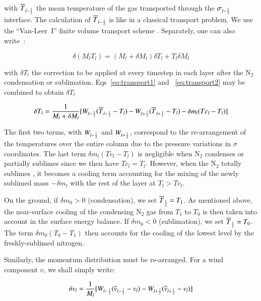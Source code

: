 with $\overline{T}_{l-\frac{1}{2}}$  the mean temperature of the gas transported
through the $\sigma_{l-\frac{1}{2}}$ interface.  
The calculation  of $\overline{T}_{l-\frac{1}{2}}$ is like in 
a classical transport problem. We use 
the ``Van-Leer~I'' finite volume transport scheme \citep{VanL:77,Hour:99}.
Separately, one can also write~:

\begin{equation}
\label{eq:transport2}
{\delta(M_l T_l)} =
 (M_l + \delta M_l) {\delta T_l} + T_l{\delta M_l }
\end{equation}

with  $\delta T_l$ the correction to be applied at every timestep
in each layer after the N$_2$ condensation or sublimation.
Eqs~\ref{eq:transport1} and ~\ref{eq:transport2} may be combined
to obtain $\delta T_l$

\begin{equation}
\label{eq:transport3}
\delta T_l = \frac{1}{M_l + \delta M_l}
[ W_{l-\frac{1}{2}} (\overline{T}_{l-\frac{1}{2}} - T_l)
- W_{l+\frac{1}{2}}(\overline{T}_{l+\frac{1}{2}} - T_l) - \delta m_l (Tc_l
-T_l) ]
\end{equation}

The first two terms, with $W_{l-\frac{1}{2}}$ and $W_{l+\frac{1}{2}}$, correspond to
the re-arrangement of the temperatures over the entire
column due to the pressure variations in $\sigma$ coordinates.
The last term $\delta m_l(Tc_l -T_l)$ is negligible
when N$_2$ condenses or partially sublimes since we then  have
 $Tc_l =  T_l$.  However, when  the N$_2$ totally sublimes
, it becomes
a cooling term  accounting for the mixing of the newly sublimed mass
$-\delta m_l$ with the rest of the layer at $T_l > Tc_l$.

On the ground, if $\delta m_0 > 0$  (condensation), we set $\overline{T}_{\frac{1}{2}} =
T_1$. 
As mentioned above, the near-surface cooling of the condensing 
N$_2$ gas from $T_1$ to $T_0$
is then taken into account in the surface energy balance.
If $\delta m_0 < 0$ (sublimation), we set  $\overline{T}_{\frac{1}{2}} =  T_0$.
The term $\delta m_0(T_0 - T_1)$ then accounts for the cooling of the lowest
level by the freshly-sublimed nitrogen.

Similarly, the momentum distribution must be re-arranged.  
For a wind component $v$, we shall simply write:

\begin{equation}
\delta v_l = \frac{1 }{M_l}
[ W_{l-\frac{1}{2}}(\overline{v}_{l-\frac{1}{2}} - v_l)
- W_{l+\frac{1}{2}}(\overline{v}_{l+\frac{1}{2}} - v_l)]
\end{equation}

